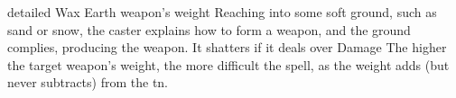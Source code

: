   {detailed}%
  {Wax}%
  {Earth}%
  {weapon's \gls{weight}}%
  {Reaching into some soft ground, such as sand or snow, the caster explains how to form a weapon, and the ground complies, producing the weapon.
  It shatters if it deals over  Damage}%
  {
    The higher the target weapon's \gls{weight}, the more difficult the spell, as the \gls{weight} adds (but never subtracts) from the \gls{tn}.
  }
